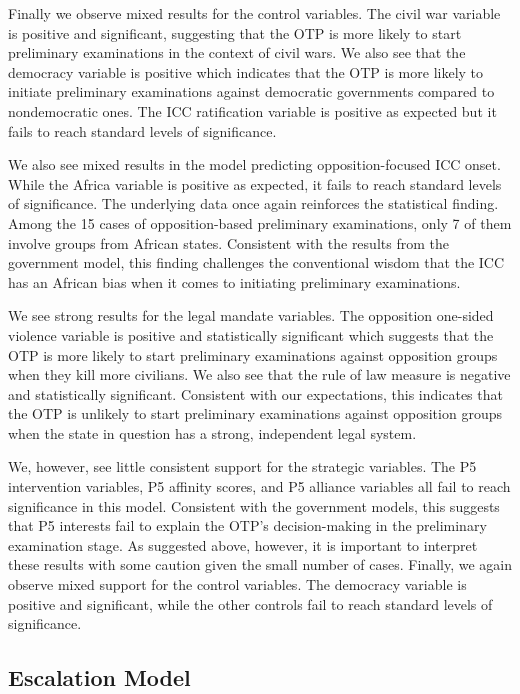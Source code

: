 Finally we observe mixed results for the control variables. The civil war variable is positive and significant, suggesting that the OTP is more likely to start preliminary examinations in the context of civil wars. We also see that the democracy variable is positive which indicates that the OTP is more likely to initiate preliminary examinations against democratic governments compared to nondemocratic ones.  The ICC ratification variable is positive as expected but it fails to reach standard levels of significance. 

We also see mixed results in the model predicting opposition-focused ICC onset. While the Africa variable is positive as expected, it fails to reach standard levels of significance. The underlying data once again reinforces the statistical finding. Among the 15 cases of opposition-based preliminary examinations, only 7 of them involve groups from African states. Consistent with the results from the government model, this finding challenges the conventional wisdom that the ICC has an African bias when it comes to initiating preliminary examinations. 

We see strong results for the legal mandate variables. The opposition one-sided violence variable is positive and statistically significant which suggests that the OTP is more likely to start preliminary examinations against opposition groups when they kill more civilians. We also see that the rule of law measure is negative and statistically significant. Consistent with our expectations, this indicates that the OTP is unlikely to start preliminary examinations against opposition groups when the state in question has a strong, independent legal system.

We, however, see little consistent support for the strategic variables. The P5 intervention variables, P5 affinity scores, and P5 alliance variables all fail to reach significance in this model. Consistent with the government models, this suggests that P5 interests fail to explain the OTP’s decision-making in the preliminary examination stage.  As suggested above, however, it is important to interpret these results with some caution given the small number of cases.  Finally, we again observe mixed support for the control variables. The democracy variable is positive and significant, while the other controls fail to reach standard levels of significance. 

\subsection*{Escalation Model}

